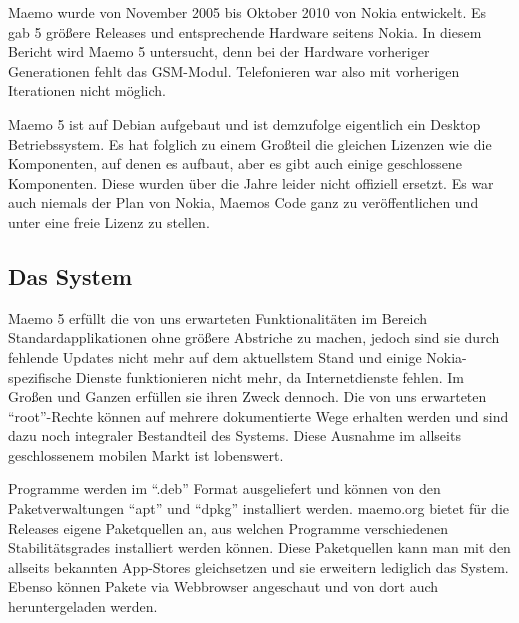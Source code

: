 Maemo wurde von November 2005\thinspace\cite{online:maemo1-770} bis Oktober 2010\thinspace\cite{online:maemo5-n900} von Nokia entwickelt. Es gab 5 größere Releases und entsprechende Hardware seitens \mbox{Nokia}\thinspace\cite{online:maemo1-770}\thinspace\cite{online:n800-specs}\thinspace\cite{online:n810-specs}\thinspace\cite{online:n900-specs}. In diesem Bericht wird Maemo 5 untersucht, denn bei der Hardware vorheriger Generationen fehlt das GSM-Modul. Telefonieren war also mit vorherigen Iterationen nicht möglich.

Maemo 5 ist auf Debian aufgebaut\thinspace\cite{online:maemo-about} und ist demzufolge eigentlich ein Desktop Betriebssystem. Es hat folglich zu einem Großteil die gleichen Lizenzen wie die Komponenten, auf denen es aufbaut, aber es gibt auch einige geschlossene Komponenten\thinspace\cite{online:maemo5-components}. Diese wurden über die Jahre leider nicht offiziell ersetzt. Es war auch niemals der Plan von Nokia, Maemos Code ganz zu veröffentlichen und unter eine freie Lizenz zu stellen\thinspace\cite{online:maemo-slides}.
\newline

\subsection{Das System}
Maemo 5 erfüllt die von uns erwarteten Funktionalitäten im Bereich Standardapplikationen ohne größere Abstriche zu machen, jedoch sind sie durch fehlende Updates nicht mehr auf dem aktuellstem Stand und einige Nokia-spezifische Dienste funktionieren nicht mehr, da Internetdienste fehlen. Im Großen und Ganzen erfüllen sie ihren Zweck dennoch. Die von uns erwarteten ``root''-Rechte können auf mehrere dokumentierte Wege erhalten werden und sind dazu noch integraler Bestandteil des Systems\thinspace\cite{online:maemo-root}. Diese Ausnahme im allseits geschlossenem mobilen Markt ist lobenswert.

Programme werden im ``.deb'' Format ausgeliefert und können von den Paketverwaltungen ``apt'' und ``dpkg'' installiert werden\thinspace\cite{online:maemo-packetinstalling}.
\mbox{maemo.org} bietet für die Releases eigene Paketquellen an, aus welchen Programme verschiedenen Stabilitätsgrades installiert werden können\thinspace\cite{online:maemo-extras}. Diese Paketquellen kann man mit den allseits bekannten \mbox{App-Stores} gleichsetzen und sie erweitern lediglich das System. Ebenso können Pakete via Webbrowser angeschaut und von dort auch heruntergeladen  werden\thinspace\cite{online:maemo-store}\thinspace\cite{online:maemo-rawrepos}.

